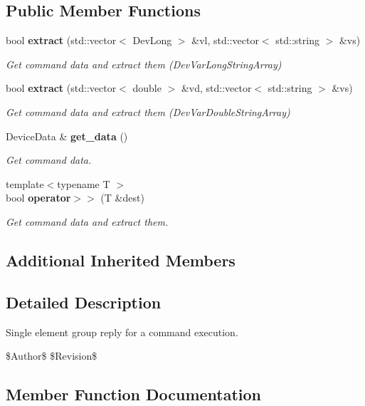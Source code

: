 \subsection*{Public Member Functions}
\begin{DoxyCompactItemize}
\item 
bool {\bf extract} (std\-::vector$<$ Dev\-Long $>$ \&vl, std\-::vector$<$ std\-::string $>$ \&vs)
\begin{DoxyCompactList}\small\item\em Get command data and extract them (Dev\-Var\-Long\-String\-Array) \end{DoxyCompactList}\item 
bool {\bf extract} (std\-::vector$<$ double $>$ \&vd, std\-::vector$<$ std\-::string $>$ \&vs)
\begin{DoxyCompactList}\small\item\em Get command data and extract them (Dev\-Var\-Double\-String\-Array) \end{DoxyCompactList}\item 
Device\-Data \& {\bf get\-\_\-data} ()
\begin{DoxyCompactList}\small\item\em Get command data. \end{DoxyCompactList}\item 
{\footnotesize template$<$typename T $>$ }\\bool {\bf operator$>$$>$} (T \&dest)
\begin{DoxyCompactList}\small\item\em Get command data and extract them. \end{DoxyCompactList}\end{DoxyCompactItemize}
\subsection*{Additional Inherited Members}


\subsection{Detailed Description}
Single element group reply for a command execution. 

\$\-Author\$ \$\-Revision\$ 

\subsection{Member Function Documentation}
